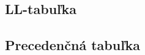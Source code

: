 \documentclass[a4paper, 12pt]{article}
\begin{document}
\begin{landscape}
\begin{figure}[ht]
\subsection{LL-tabuľka} \label{subsec:lltable}
    \begin{center}
    \end{center}
\end{figure}
\end{landscape}
\newpage


\begin{landscape}
\begin{figure}[ht]
\subsection{Precedenčná tabuľka} \label{subsec:precetable}
    \begin{center}
    \end{center}
\end{figure}
\end{landscape}
\newpage
\end{document}
